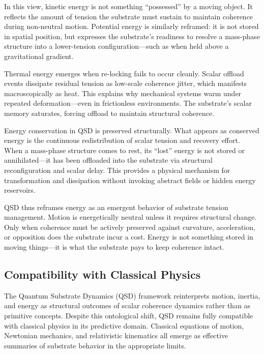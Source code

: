 \documentclass[entropy,article,submit,pdftex,moreauthors]{Definitions/mdpi}
\begin{document}
In this view, kinetic energy is not something “possessed” by a moving object. It reflects the amount of tension the substrate must sustain to maintain coherence during non-neutral motion. Potential energy is similarly reframed: it is not stored in spatial position, but expresses the substrate’s readiness to resolve a mass-phase structure into a lower-tension configuration—such as when held above a gravitational gradient.

Thermal energy emerges when re-locking fails to occur cleanly. Scalar offload events dissipate residual tension as low-scale coherence jitter, which manifests macroscopically as heat. This explains why mechanical systems warm under repeated deformation—even in frictionless environments. The substrate's scalar memory saturates, forcing offload to maintain structural coherence.

Energy conservation in QSD is preserved structurally. What appears as conserved energy is the continuous redistribution of scalar tension and recovery effort. When a mass-phase structure comes to rest, its “lost” energy is not stored or annihilated—it has been offloaded into the substrate via structural reconfiguration and scalar delay. This provides a physical mechanism for transformation and dissipation without invoking abstract fields or hidden energy reservoirs.

QSD thus reframes energy as an emergent behavior of substrate tension management. Motion is energetically neutral unless it requires structural change. Only when coherence must be actively preserved against curvature, acceleration, or opposition does the substrate incur a cost. Energy is not something stored in moving things—it is what the substrate pays to keep coherence intact.


\subsection{Compatibility with Classical Physics}

The Quantum Substrate Dynamics (QSD) framework reinterprets motion, inertia, and energy as structural outcomes of scalar coherence dynamics rather than as primitive concepts. Despite this ontological shift, QSD remains fully compatible with classical physics in its predictive domain. Classical equations of motion, Newtonian mechanics, and relativistic kinematics all emerge as effective summaries of substrate behavior in the appropriate limits.
\end{document}
